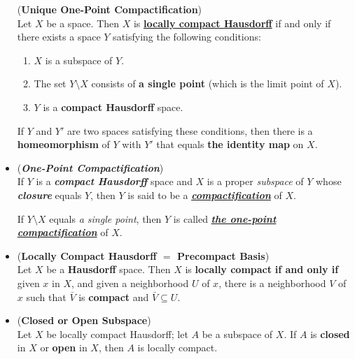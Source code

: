 \documentclass[11pt]{article}
\begin{document}
\begin{itemize}
\begin{theorem} (\textbf{Unique One-Point Compactification}) \citep{munkres2000topology}\\
Let $X$ be a space. Then $X$ is \underline{\textbf{locally compact Hausdorff}} if and only if there exists a space $Y$ satisfying the following conditions:
\begin{enumerate}
\item $X$ is a subspace of $Y$.
\item The set $Y \setminus X$ consists of \textbf{a single point} (which is the limit point of $X$).
\item $Y$ is a \textbf{compact Hausdorff} space.
\end{enumerate} 
If $Y$ and $Y'$ are two spaces satisfying these conditions, then there is a \textbf{homeomorphism} of $Y$ with $Y'$ that equals \textbf{the identity map} on $X$.
\end{theorem}

\item \begin{definition} (\emph{\textbf{One-Point Compactification}})\\
If $Y$ is a \emph{\textbf{compact Hausdorff}} space and $X$ is a proper \emph{subspace} of $Y$ whose \emph{\textbf{closure}} equals $Y$, then $Y$ is said to be a \underline{\textbf{\emph{compactification}}} of $X$. 

If $Y\setminus X$ equals \emph{a single point}, then $Y$ is called \underline{\textbf{\emph{the one-point compactification}}} of $X$.
\end{definition}

\item \begin{proposition} (\textbf{Locally Compact Hausdorff $=$ Precompact Basis}) \citep{munkres2000topology} \\
Let $X$ be a \textbf{Hausdorff} space. Then $X$ is \textbf{locally compact} \textbf{if and only if} given $x$ in $X$, and given a neighborhood $U$ of $x$, there is a neighborhood $V$ of $x$ such that $\bar{V}$ is \textbf{compact} and $\bar{V} \subseteq U$.
\end{proposition}

\item \begin{corollary} (\textbf{Closed or Open Subspace}) \citep{munkres2000topology} \\
Let $X$ be locally compact Hausdorff; let $A$ be a subspace of $X$. If $A$ is \textbf{closed} in $X$ or \textbf{open} in $X$, then $A$ is locally compact.
\end{corollary}


\end{itemize}
\end{document}
